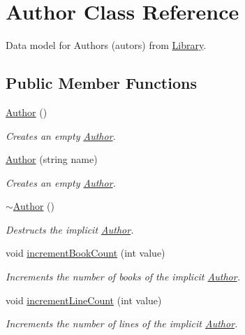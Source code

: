 \hypertarget{class_author}{}\section{Author Class Reference}
\label{class_author}


Data model for Authors (autors) from \hyperlink{class_library}{Library}.  


\subsection*{Public Member Functions}
\begin{DoxyCompactItemize}
\item 
\hyperlink{class_author_a5f7059590a8e823fe0713faf66126b17}{Author} ()
\begin{DoxyCompactList}\small\item\em Creates an empty \hyperlink{class_author}{Author}. \end{DoxyCompactList}\item 
\hyperlink{class_author_a4a8afd3af0d6f7492bd04dcd44dc9f95}{Author} (string name)
\begin{DoxyCompactList}\small\item\em Creates an empty \hyperlink{class_author}{Author}. \end{DoxyCompactList}\item 
\hyperlink{class_author_ae1d4db056b321487cf7c07a2045d4a2d}{$\sim$\+Author} ()
\begin{DoxyCompactList}\small\item\em Destructs the implicit \hyperlink{class_author}{Author}. \end{DoxyCompactList}\item 
void \hyperlink{class_author_afa8dc68382f3e9828112ed440c3677d3}{increment\+Book\+Count} (int value)
\begin{DoxyCompactList}\small\item\em Increments the number of books of the implicit \hyperlink{class_author}{Author}. \end{DoxyCompactList}\item 
void \hyperlink{class_author_a73814ef0d8d840880415c4020a4d5bf9}{increment\+Line\+Count} (int value)
\begin{DoxyCompactList}\small\item\em Increments the number of lines of the implicit \hyperlink{class_author}{Author}. \end{DoxyCompactList}\item 

\end{DoxyCompactItemize}
